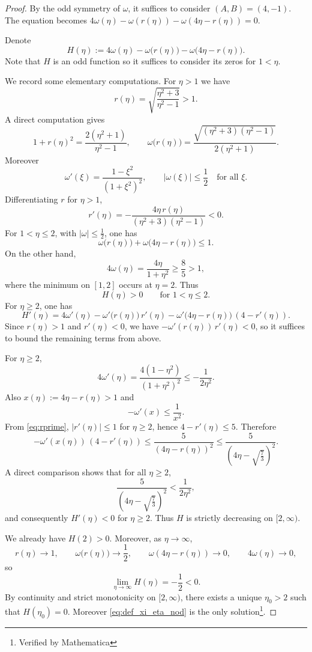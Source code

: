 \documentclass[10pt,a4paper]{amsart}
\begin{document}
\begin{proof}
    By the odd symmetry of $\omega$, it suffices to consider $(A,B) = (4,-1)$. The equation becomes $4\omega(\eta) - \omega(r(\eta)) - \omega(4\eta - r(\eta)) = 0$.

Denote 
\begin{equation}
    H(\eta):=4\omega(\eta)-\omega\big(r(\eta)\big)
-\omega\big(4\eta-r(\eta)\big).
\end{equation}Note that $H$ is an odd function so it suffices to consider its zeros for  $1<\eta$.

We record some elementary computations. For $\eta>1$ we have
$$
r(\eta)=\sqrt{\frac{\eta^2+3}{\eta^2-1}}>1.
$$
A direct computation gives
$$
1+r(\eta)^2=\frac{2(\eta^2+1)}{\eta^2-1},
\qquad
\omega\big(r(\eta)\big)
=\frac{\sqrt{(\eta^2+3)(\eta^2-1)}}{2(\eta^2+1)}.
$$
Moreover
$$
\omega'(\xi)=\frac{1-\xi^2}{(1+\xi^2)^2},
\qquad
|\omega(\xi)|\le \frac12 \quad\text{for all }\xi.
$$
Differentiating $r$ for $\eta>1$,
\begin{equation}\label{eq:rprime}
r'(\eta)=-\frac{4\eta\,r(\eta)}{(\eta^2+3)(\eta^2-1)}<0.
\end{equation}
For $1<\eta\le2$, with $|\omega|\le\frac12$, one has
$$
\omega\big(r(\eta)\big)+\omega\big(4\eta-r(\eta)\big)\le1.
$$
On the other hand,
$$
4\omega(\eta)=\frac{4\eta}{1+\eta^2}
\ge \frac{8}{5}>1,
$$
where the minimum on $[1,2]$ occurs at $\eta=2$. Thus
$$
H(\eta)>0\qquad\text{for }1<\eta\le2.
$$
For $\eta\ge2$, one has
$$
H'(\eta)
=4\omega'(\eta)
-\omega'\big(r(\eta)\big)\,r'(\eta)
-\omega'\big(4\eta-r(\eta)\big)\,(4-r'(\eta)).
$$
Since $r(\eta)>1$ and $r'(\eta)<0$, we have $
-\omega'(r(\eta))\,r'(\eta)<0$,
so it suffices to bound the remaining terms from above.    

For $\eta\ge2$,
$$
4\omega'(\eta)
=\frac{4(1-\eta^2)}{(1+\eta^2)^2}
\le -\frac{1}{2\eta^2}.
$$
Also $x(\eta):=4\eta-r(\eta)>1$ and
$$
-\omega'(x)\le \frac{1}{x^2}.
$$
From \eqref{eq:rprime}, $|r'(\eta)|\le1$ for $\eta\ge2$, hence
$4-r'(\eta)\le5$. Therefore
$$
-\omega'(x(\eta))\,(4-r'(\eta))
\le \frac{5}{(4\eta-r(\eta))^2}
\le \frac{5}{(4\eta-\sqrt{\frac{7}{3}})^2}.
$$
A direct comparison shows that for all $\eta\ge2$,
$$
\frac{5}{(4\eta-\sqrt{\frac{7}{3}})^2}
<\frac{1}{2\eta^2},
$$
and consequently $H'(\eta)<0$ for $\eta\ge2$. Thus $H$ is strictly
decreasing on $[2,\infty)$.

We already have $H(2)>0$. Moreover, as $\eta\to\infty$,
$$
r(\eta)\to1,\qquad
\omega\big(r(\eta)\big)\to\frac12,\qquad
\omega(4\eta-r(\eta))\to0,\qquad
4\omega(\eta)\to0,
$$
so
$$
\lim_{\eta\to\infty}H(\eta)=-\frac12<0.
$$
By continuity and strict monotonicity on $[2,\infty)$, there exists a
unique $\eta_0>2$ such that $H(\eta_0)=0$.
Moreover \eqref{eq:def_xi_eta_nod} is the only solution\footnote{Verified by Mathematica}.
\end{proof}
\end{document}
